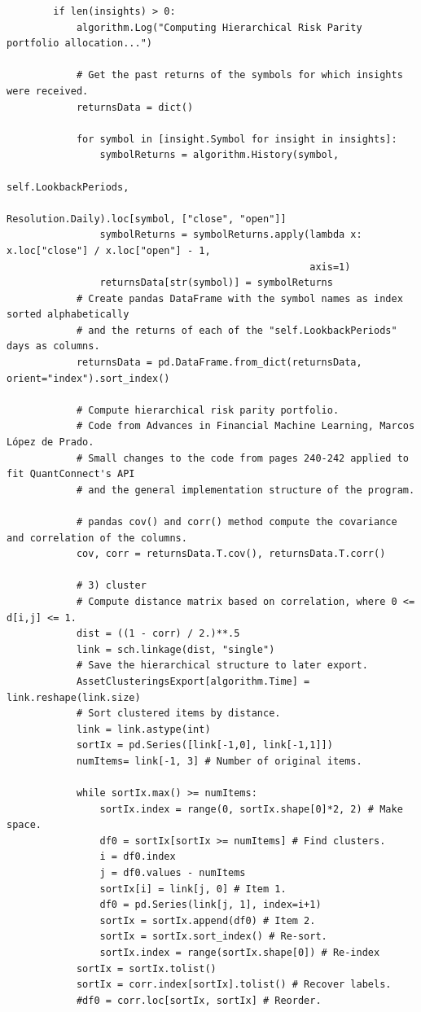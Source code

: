 \begin{verbatim}
        if len(insights) > 0:
            algorithm.Log("Computing Hierarchical Risk Parity portfolio allocation...")
            
            # Get the past returns of the symbols for which insights were received.
            returnsData = dict()
        
            for symbol in [insight.Symbol for insight in insights]:
                symbolReturns = algorithm.History(symbol,
                                                  self.LookbackPeriods,
                                                  Resolution.Daily).loc[symbol, ["close", "open"]]
                symbolReturns = symbolReturns.apply(lambda x: x.loc["close"] / x.loc["open"] - 1,
                                                    axis=1)
                returnsData[str(symbol)] = symbolReturns
            # Create pandas DataFrame with the symbol names as index sorted alphabetically
            # and the returns of each of the "self.LookbackPeriods" days as columns.
            returnsData = pd.DataFrame.from_dict(returnsData, orient="index").sort_index()
            
            # Compute hierarchical risk parity portfolio.
            # Code from Advances in Financial Machine Learning, Marcos López de Prado.
            # Small changes to the code from pages 240-242 applied to fit QuantConnect's API
            # and the general implementation structure of the program.
            
            # pandas cov() and corr() method compute the covariance and correlation of the columns.
            cov, corr = returnsData.T.cov(), returnsData.T.corr()
        
            # 3) cluster
            # Compute distance matrix based on correlation, where 0 <= d[i,j] <= 1.
            dist = ((1 - corr) / 2.)**.5
            link = sch.linkage(dist, "single")
            # Save the hierarchical structure to later export.
            AssetClusteringsExport[algorithm.Time] = link.reshape(link.size)
            # Sort clustered items by distance.
            link = link.astype(int)
            sortIx = pd.Series([link[-1,0], link[-1,1]])
            numItems= link[-1, 3] # Number of original items.
            
            while sortIx.max() >= numItems:
                sortIx.index = range(0, sortIx.shape[0]*2, 2) # Make space.
                df0 = sortIx[sortIx >= numItems] # Find clusters.
                i = df0.index
                j = df0.values - numItems
                sortIx[i] = link[j, 0] # Item 1.
                df0 = pd.Series(link[j, 1], index=i+1)
                sortIx = sortIx.append(df0) # Item 2.
                sortIx = sortIx.sort_index() # Re-sort.
                sortIx.index = range(sortIx.shape[0]) # Re-index
            sortIx = sortIx.tolist()
            sortIx = corr.index[sortIx].tolist() # Recover labels.
            #df0 = corr.loc[sortIx, sortIx] # Reorder.
        

\end{verbatim}
